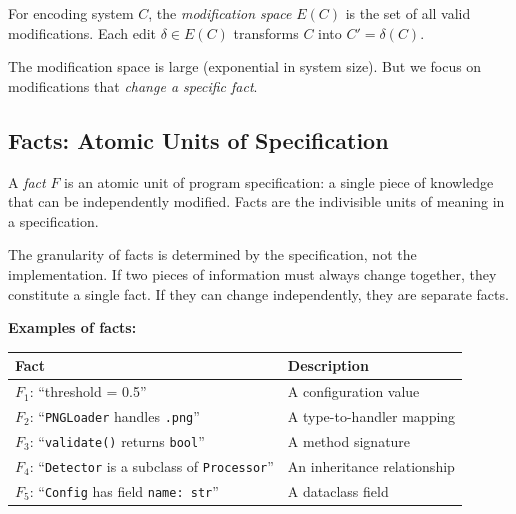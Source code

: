 \begin{definition}
For encoding system $C$, the \emph{modification space} $E(C)$ is the set of all valid modifications. Each edit $\delta \in E(C)$ transforms $C$ into $C' = \delta(C)$.
\end{definition}

The modification space is large (exponential in system size). But we focus on modifications that \emph{change a specific fact}.

\subsection{Facts: Atomic Units of Specification}\label{sec:facts}

\begin{definition}[Fact]\label{def:fact}
A \emph{fact} $F$ is an atomic unit of program specification: a single piece of knowledge that can be independently modified. Facts are the indivisible units of meaning in a specification.
\end{definition}

The granularity of facts is determined by the specification, not the implementation. If two pieces of information must always change together, they constitute a single fact. If they can change independently, they are separate facts.

\noindent\textbf{Examples of facts:}

\begin{center}
\small
\setlength{\tabcolsep}{3pt}
\begin{tabularx}{\linewidth}{@{}>{\RaggedRight\arraybackslash\hsize=0.95\hsize}X>{\RaggedRight\arraybackslash\hsize=1.05\hsize}X@{}}
\toprule
\textbf{Fact} & \textbf{Description} \\
\midrule
$F_1$: ``threshold = 0.5'' & A configuration value \\
$F_2$: ``\texttt{PNGLoader} handles \texttt{.png}'' & A type-to-handler mapping \\
$F_3$: ``\texttt{validate()} returns \texttt{bool}'' & A method signature \\
$F_4$: ``\texttt{Detector} is a subclass of \texttt{Processor}'' & An inheritance relationship \\
$F_5$: ``\texttt{Config} has field \texttt{name: str}'' & A dataclass field \\
\bottomrule
\end{tabularx}
\end{center}

